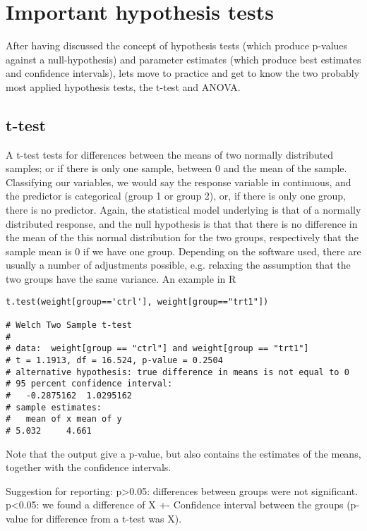 \documentclass[a4paper,twoside]{tufte-book} %
\begin{document}
\chapter{Important hypothesis tests}

After having discussed the concept of hypothesis tests (which produce p-values against a null-hypothesis) and parameter estimates (which produce best estimates and confidence intervals), lets move to practice and get to know the two probably most applied hypothesis tests, the t-test and ANOVA.

\section{t-test}

A t-test tests for differences between the means of two normally distributed samples; or if there is only one sample, between 0 and the mean of the sample. Classifying our variables, we would say the response variable in continuous, and the predictor is categorical (group 1 or group 2), or, if there is only one group, there is no predictor. Again, the statistical model underlying is that of a normally distributed response, and the null hypothesis is that that there is no difference in the mean of the this normal distribution for the two groups, respectively that the sample mean is 0 if we have one group. Depending on the software used, there are usually a number of adjustments possible, e.g. relaxing the assumption that the two groups have the same variance. An example in R

\begin{lstlisting}
t.test(weight[group=='ctrl'], weight[group=="trt1"])

# Welch Two Sample t-test
# 
# data:  weight[group == "ctrl"] and weight[group == "trt1"] 
# t = 1.1913, df = 16.524, p-value = 0.2504
# alternative hypothesis: true difference in means is not equal to 0 
# 95 percent confidence interval:
#   -0.2875162  1.0295162 
# sample estimates:
#   mean of x mean of y 
# 5.032     4.661 
\end{lstlisting}

Note that the output give a p-value, but also contains the estimates of the means, together with the confidence intervals. 

Suggestion for reporting: p>0.05: differences between groups were not significant. p<0.05: we found a difference of X +- Confidence interval between the groups (p-value for difference from a t-test was X). 
\end{document}
